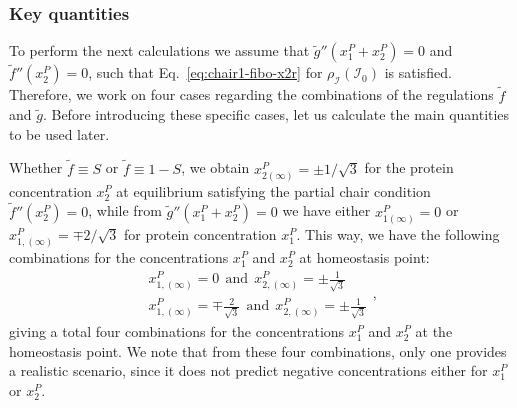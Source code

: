 \subsubsection{Key quantities}

To perform the next calculations we assume that $\tilde{g}''(x_1^P + x_2^P) = 0$ and $\tilde{f}''(x_2^P) = 0$, 
such that Eq.~\ref{eq:chair1-fibo-x2r} for $\rho_{\mathcal{I}}(\mathcal{I}_0)$ is satisfied. Therefore, we work
on four cases regarding the combinations of the regulations $\tilde{f}$ and $\tilde{g}$. Before introducing 
these specific cases, let us calculate the main quantities to be used later.

Whether $\tilde{f} \equiv S$ or $\tilde{f} \equiv 1 - S$, we obtain $x_{2(\infty)}^P = \pm 1/\sqrt{3}$ for the 
protein concentration $x_2^P$ at equilibrium satisfying the partial chair condition $\tilde{f}''(x_2^P) = 0$, 
while from $\tilde{g}''(x_1^P + x_2^P) = 0$ we have either $x_{1(\infty)}^P = 0$ or 
$x_{1,(\infty)}^P = \mp 2/\sqrt{3}$ for protein concentration $x_1^P$. This way, we have the following 
combinations for the concentrations $x_1^P$ and $x_2^P$ at homeostasis point:
\begin{equation}
    \begin{aligned}
        x_{1,(\infty)}^P = 0 \ \ \text{and} \ \ x_{2,(\infty)}^P = \pm \frac{1}{\sqrt{3}}\\
        x_{1,(\infty)}^P = \mp \frac{2}{\sqrt{3}} \ \ \text{and} \ \ x_{2,(\infty)}^P = \pm \frac{1}{\sqrt{3}}
    \end{aligned},
\end{equation}
giving a total four combinations for the concentrations $x_1^P$ and $x_2^P$ at the homeostasis point. We note 
that from these four combinations, only one provides a realistic scenario, since it does not predict negative
concentrations either for $x_1^P$ or $x_2^P$.

